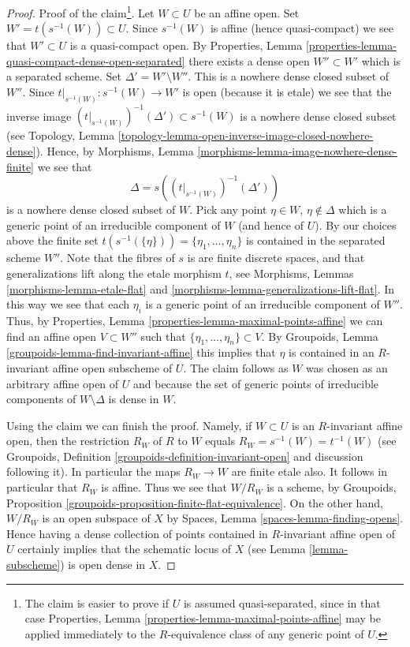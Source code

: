 \begin{proof}
\medskip\noindent
Proof of the claim\footnote{The claim is easier to prove if
$U$ is assumed quasi-separated, since in that case
Properties, Lemma \ref{properties-lemma-maximal-points-affine}
may be applied immediately to the $R$-equivalence class of any
generic point of $U$.}. Let $W \subset U$ be an affine open.
Set $W' = t(s^{-1}(W)) \subset U$. Since $s^{-1}(W)$ is affine
(hence quasi-compact) we see that $W' \subset U$ is a quasi-compact open. By
Properties, Lemma \ref{properties-lemma-quasi-compact-dense-open-separated}
there exists a dense open $W'' \subset W'$ which is a separated scheme.
Set $\Delta' = W' \setminus W''$. This is a nowhere dense closed subset of
$W''$. Since $t|_{s^{-1}(W)} : s^{-1}(W) \to W'$ is open (because it is etale)
we see that the inverse image
$(t|_{s^{-1}(W)})^{-1}(\Delta') \subset s^{-1}(W)$
is a nowhere dense closed subset (see
Topology, Lemma \ref{topology-lemma-open-inverse-image-closed-nowhere-dense}).
Hence, by
Morphisms, Lemma \ref{morphisms-lemma-image-nowhere-dense-finite} 
we see that
$$
\Delta = s\left((t|_{s^{-1}(W)})^{-1}(\Delta')\right)
$$
is a nowhere dense closed subset of $W$. Pick any point $\eta \in W$,
$\eta \not \in \Delta$ which is a generic point of an irreducible
component of $W$ (and hence of $U$). By our choices above the finite set
$t(s^{-1}(\{\eta\})) = \{\eta_1, \ldots, \eta_n\}$
is contained in the separated scheme $W''$.
Note that the fibres of $s$ is are finite discrete spaces, and that
generalizations lift along the etale morphism $t$, see
Morphisms, Lemmas \ref{morphisms-lemma-etale-flat}
and \ref{morphisms-lemma-generalizations-lift-flat}.
In this way we see that each $\eta_i$ is a generic point of an
irreducible component of $W''$. Thus, by
Properties, Lemma \ref{properties-lemma-maximal-points-affine}
we can find an affine open $V \subset W''$ such that
$\{\eta_1, \ldots, \eta_n\} \subset V$.
By
Groupoids, Lemma \ref{groupoids-lemma-find-invariant-affine}
this implies that $\eta$ is contained in an $R$-invariant affine
open subscheme of $U$. The claim follows as $W$ was chosen as an
arbitrary affine open of $U$ and because the set of generic points
of irreducible components of $W \setminus \Delta$ is dense in $W$.

\medskip\noindent
Using the claim we can finish the proof. Namely, if $W \subset U$ is
an $R$-invariant affine open, then the restriction $R_W$ of $R$ to $W$
equals $R_W = s^{-1}(W) = t^{-1}(W)$ (see
Groupoids, Definition \ref{groupoids-definition-invariant-open}
and discussion following it). In particular the maps $R_W \to W$ are
finite etale also. It follows in particular that $R_W$ is affine.
Thus we see that $W/R_W$ is a scheme, by
Groupoids, Proposition \ref{groupoids-proposition-finite-flat-equivalence}.
On the other hand, $W/R_W$ is an open subspace of $X$ by
Spaces, Lemma \ref{spaces-lemma-finding-opens}.
Hence having a dense collection of points contained in $R$-invariant
affine open of $U$ certainly implies that the schematic locus of $X$
(see Lemma \ref{lemma-subscheme})
is open dense in $X$.
\end{proof}
